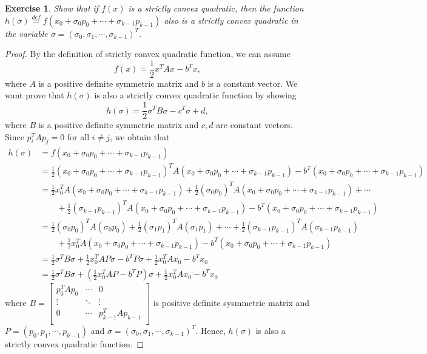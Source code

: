 \documentclass[11pt,a4paper]{article}
\renewcommand{\(}{\left(}
\renewcommand{\)}{\right)}
\newtheorem{exercise}{Exercise}
\begin{document}
  \begin{exercise}
  	Show that if $f(x)$ is a strictly convex quadratic, then the function $h(\sigma)\overset{\scriptscriptstyle def}{=}f(x_0+\sigma_0p_0+\cdots+\sigma_{k-1}p_{k-1})$ also is a strictly convex quadratic in the variable $\sigma = (\sigma_0,\sigma_1,\cdots,\sigma_{k-1})^T.$
  \end{exercise}  
  \begin{proof}
	By the definition of strictly convex quadratic function, we can assume $$f(x) = \frac{1}{2}x^TAx-b^Tx,$$ where $A$ is a positive definite symmetric matrix and $b$ is a constant vector.
	We want prove that $h(\sigma)$ is also a strictly convex quadratic function by showing $$h(\sigma) = \frac{1}{2}\sigma^TB\sigma-c^T\sigma+d,$$ where $B$ is a positive definite symmetric matrix and $c,d$ are constant vectors.
	Since $p_i^TAp_j = 0$ for all $i\neq j$, we obtain that
	\begin{align*}
		h(\sigma) &= f(x_0+\sigma_0p_0+\cdots+\sigma_{k-1}p_{k-1})\\
		&=\frac{1}{2}(x_0+\sigma_0p_0+\cdots+\sigma_{k-1}p_{k-1})^TA(x_0+\sigma_0p_0+\cdots+\sigma_{k-1}p_{k-1})-b^T(x_0+\sigma_0p_0+\cdots+\sigma_{k-1}p_{k-1})\\
		&=\frac{1}{2}x_0^TA(x_0+\sigma_0p_0+\cdots+\sigma_{k-1}p_{k-1})+\frac{1}{2}(\sigma_0p_0)^TA(x_0+\sigma_0p_0+\cdots+\sigma_{k-1}p_{k-1})+\cdots \\ &\qquad+\frac{1}{2}(\sigma_{k-1}p_{k-1})^TA(x_0+\sigma_0p_0+\cdots+\sigma_{k-1}p_{k-1})-b^T(x_0+\sigma_0p_0+\cdots+\sigma_{k-1}p_{k-1})\\
		&= \frac{1}{2}(\sigma_0p_0)^TA(\sigma_0p_0)+\frac{1}{2}(\sigma_1p_1)^TA(\sigma_1p_1)+\cdots + \frac{1}{2}(\sigma_{k-1}p_{k-1})^TA(\sigma_{k-1}p_{k-1})\\
		&\qquad+\frac{1}{2}x_0^TA(x_0+\sigma_0p_0+\cdots+\sigma_{k-1}p_{k-1})-b^T(x_0+\sigma_0p_0+\cdots+\sigma_{k-1}p_{k-1})\\
		&= \frac{1}{2}\sigma^T B \sigma+\frac{1}{2}x_0^TAP\sigma-b^TP\sigma+\frac{1}{2}x_0^TAx_0-b^Tx_0\\
		&= \frac{1}{2}\sigma^T B \sigma+ (\frac{1}{2}x_0^TAP-b^TP)\sigma+\frac{1}{2}x_0^TAx_0-b^Tx_0
	\end{align*}
	where $B = 
	\begin{bmatrix}
		p_0^TAp_0 & \cdots & 0\\
		\vdots & \ddots & \vdots\\
		0& \cdots & p_{k-1}^TAp_{k-1}\\
	\end{bmatrix}
	$ is positive definite sysmmetric matrix and $P = (p_0,p_1,\cdots, p_{k-1})$ and $\sigma = (\sigma_0,\sigma_1,\cdots,\sigma_{k-1})^T.$
	Hence, $h(\sigma)$ is also a strictly convex quadratic function.
  \end{proof}
  
\end{document}
